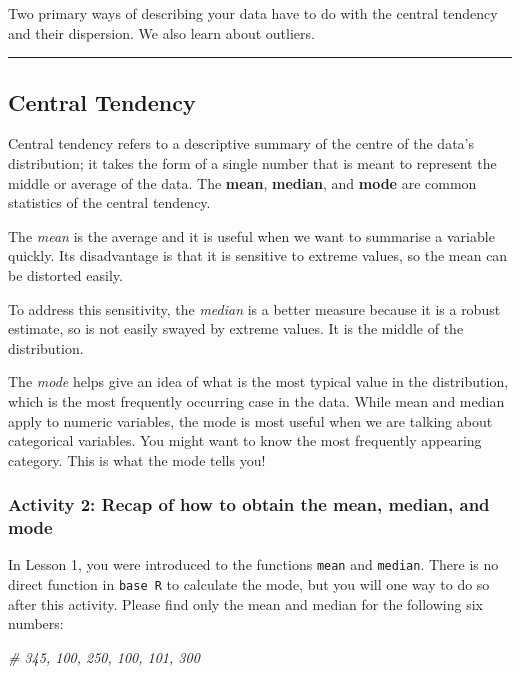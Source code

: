 \documentclass[
]{book}
\newenvironment{Shaded}{\begin{snugshade}}{\end{snugshade}}
\newcommand{\CommentTok}[1]{\textcolor[rgb]{0.56,0.35,0.01}{\textit{#1}}}
\begin{document}
Two primary ways of describing your data have to do with the central tendency and their dispersion. We also learn about outliers.

\begin{center}\rule{0.5\linewidth}{0.5pt}\end{center}

\hypertarget{central-tendency}{%
\subsection{Central Tendency}\label{central-tendency}}

Central tendency refers to a descriptive summary of the centre of the data's distribution; it takes the form of a single number that is meant to represent the middle or average of the data. The \textbf{mean}, \textbf{median}, and \textbf{mode} are common statistics of the central tendency.

The \emph{mean} is the average and it is useful when we want to summarise a variable quickly. Its disadvantage is that it is sensitive to extreme values, so the mean can be distorted easily.

To address this sensitivity, the \emph{median} is a better measure because it is a robust estimate, so is not easily swayed by extreme values. It is the middle of the distribution.

The \emph{mode} helps give an idea of what is the most typical value in the distribution, which is the most frequently occurring case in the data. While mean and median apply to numeric variables, the mode is most useful when we are talking about categorical variables. You might want to know the most frequently appearing category. This is what the mode tells you!

\hypertarget{activity-2-recap-of-how-to-obtain-the-mean-median-and-mode}{%
\subsubsection{Activity 2: Recap of how to obtain the mean, median, and mode}\label{activity-2-recap-of-how-to-obtain-the-mean-median-and-mode}}

In Lesson 1, you were introduced to the functions \texttt{mean} and \texttt{median}. There is no direct function in \texttt{base\ R} to calculate the mode, but you will one way to do so after this activity. Please find only the mean and median for the following six numbers:

\begin{Shaded}
\begin{Highlighting}[]
\CommentTok{\# 345, 100, 250, 100, 101, 300 }
\end{Highlighting}
\end{Shaded}
\end{document}
